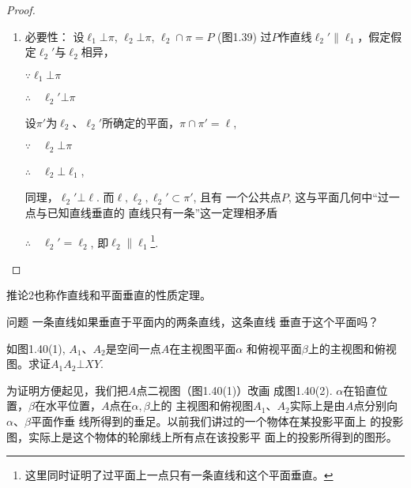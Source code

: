 \begin{proof}
\begin{enumerate}
\begin{figure}[htp]
\begin{minipage}[t]{0.48\textwidth}
\begin{tikzpicture}[>=latex, scale=1]
\end{tikzpicture}
    \caption{}
    \end{minipage}
    \end{figure}
  

  \item 必要性：
  设$ \ell_1\bot \pi$, $ \ell_2\bot \pi$, $\ell_2\cap\pi =P$ (图1.39) 过$P$作直线$\ell_2'\parallel \ell_1$，假定假定$\ell_2'$与$\ell_2$相异，

  $\because \ell_1\bot \pi$

  $\therefore\quad \ell_2'\bot \pi$

  设$\pi'$为$\ell_2$、$\ell_2'$所确定的平面，$\pi\cap \pi'=\ell$,

$\because\quad \ell_2\bot \pi$

$\therefore\quad \ell_2\bot\ell_1$,

同理，$\ell_2'\bot\ell$. 而$\ell,\ell_2,\ell_2'\subset \pi'$, 且有
  一个公共点$P$, 这与平面几何中“过一点与已知直线垂直的
  直线只有一条”这一定理相矛盾
  
$\therefore\quad \ell_2'=\ell_2$, 即$\ell_2\parallel \ell_1$\footnote{这里同时证明了过平面上一点只有一条直线和这个平面垂直。}.
\end{enumerate}
\end{proof}

  推论2也称作直线和平面垂直的性质定理。

\begin{blk}{问题}
  一条直线如果垂直于平面内的两条直线，这条直线
  垂直于这个平面吗？
\end{blk}

\begin{example}
如图1.40(1), $A_1$、$A_2$是空间一点$A$在主视图平面$\alpha$
和俯视平面$\beta$上的主视图和俯视图。求证$A_1A_2\bot XY$.

为证明方便起见，我们把$A$点二视图（图1.40(1)）改画
成图1.40(2). $\alpha$在铅直位置，$\beta$在水平位置，$A$点在$\alpha,\beta$上的
主视图和俯视图$A_1$、$A_2$实际上是由$A$点分别向$\alpha$、$\beta$平面作垂
线所得到的垂足。以前我们讲过的一个物体在某投影平面上
的投影图，实际上是这个物体的轮廓线上所有点在该投影平
面上的投影所得到的图形。
\end{example}

